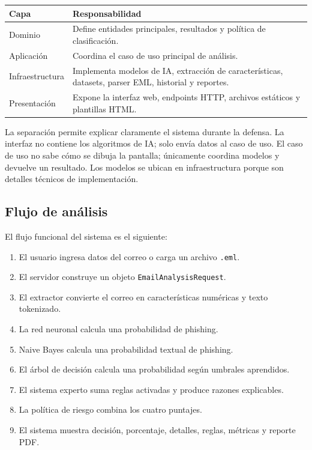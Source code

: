 \documentclass[12pt,letterpaper]{article}
\begin{document}
\begin{longtable}{p{4cm}p{10cm}}
\toprule
\textbf{Capa} & \textbf{Responsabilidad} \\
\midrule
Dominio & Define entidades principales, resultados y política de clasificación. \\
Aplicación & Coordina el caso de uso principal de análisis. \\
Infraestructura & Implementa modelos de IA, extracción de características, datasets, parser EML, historial y reportes. \\
Presentación & Expone la interfaz web, endpoints HTTP, archivos estáticos y plantillas HTML. \\
\bottomrule
\end{longtable}

La separación permite explicar claramente el sistema durante la defensa. La interfaz no contiene los algoritmos de IA; solo envía datos al caso de uso. El caso de uso no sabe cómo se dibuja la pantalla; únicamente coordina modelos y devuelve un resultado. Los modelos se ubican en infraestructura porque son detalles técnicos de implementación.

\subsection{Flujo de análisis}

El flujo funcional del sistema es el siguiente:

\begin{enumerate}
    \item El usuario ingresa datos del correo o carga un archivo \texttt{.eml}.
    \item El servidor construye un objeto \texttt{EmailAnalysisRequest}.
    \item El extractor convierte el correo en características numéricas y texto tokenizado.
    \item La red neuronal calcula una probabilidad de phishing.
    \item Naive Bayes calcula una probabilidad textual de phishing.
    \item El árbol de decisión calcula una probabilidad según umbrales aprendidos.
    \item El sistema experto suma reglas activadas y produce razones explicables.
    \item La política de riesgo combina los cuatro puntajes.
    \item El sistema muestra decisión, porcentaje, detalles, reglas, métricas y reporte PDF.
\end{enumerate}
\end{document}
